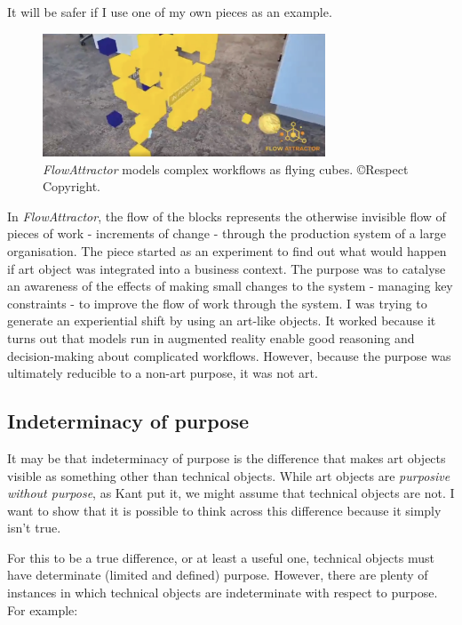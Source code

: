 \documentclass[letterpaper]{article}
\begin{document}
    It will be safer if I use one of my own pieces as an example.

    \begin{figure}[h]
    \includegraphics[width=3.31in]{flow-attractor.png}
    \caption{\emph{FlowAttractor} models complex workflows as flying cubes. \copyright Respect Copyright.}
    \end{figure}

    In \emph{FlowAttractor}, the flow of the blocks represents the otherwise invisible flow of pieces of work - increments of change - through the production system of a large organisation. The piece started as an experiment to find out what would happen if art object was integrated into a business context. The purpose was to catalyse an awareness of the effects of making small changes to the system - managing key constraints - to improve the flow of work through the system. I was trying to generate an experiential shift by using an art-like objects. It worked because it turns out that models run in augmented reality enable good reasoning and decision-making about complicated workflows. However, because the purpose was ultimately reducible to a non-art purpose, it was not art.

    \subsection{Indeterminacy of purpose}

    It may be that indeterminacy of purpose is the difference that makes art objects visible as something other than technical objects. While art objects are \emph{purposive without purpose}, as Kant put it, we might assume that technical objects are not. I want to show that it is possible to think across this difference because it simply isn't true.

    For this to be a true difference, or at least a useful one, technical objects must have determinate (limited and defined) purpose. However, there are plenty of instances in which technical objects are indeterminate with respect to purpose. For example:
\end{document}

